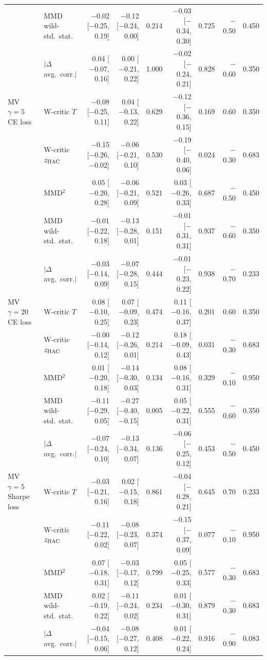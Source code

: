 \begin{tabular}{llrrrrrrr}
 & MMD wild-std.\ stat. & $-$0.02 [$-$0.25, 0.19] & $-$0.12 [$-$0.24, 0.00] & 0.214 & $-$0.03 [$-$0.34, 0.30] & 0.725 & $-$0.50 & 0.450 \\
 & $|\Delta$ avg.\ corr.$|$ & 0.04 [$-$0.07, 0.16] & 0.00 [$-$0.21, 0.22] & 1.000 & $-$0.02 [$-$0.24, 0.21] & 0.828 & $-$0.60 & 0.350 \\
MV $\gamma=5$ CE loss & W-critic $T$ & $-$0.08 [$-$0.25, 0.11] & 0.04 [$-$0.13, 0.22] & 0.629 & $-$0.12 [$-$0.36, 0.15] & 0.169 & 0.60 & 0.350 \\
 & W-critic $z_{\rm HAC}$ & $-$0.15 [$-$0.26, $-$0.02] & $-$0.06 [$-$0.21, 0.10] & 0.530 & $-$0.19 [$-$0.40, 0.06] & 0.024 & $-$0.30 & 0.683 \\
 & MMD$^2$ & 0.05 [$-$0.20, 0.28] & $-$0.06 [$-$0.21, 0.09] & 0.521 & 0.03 [$-$0.26, 0.33] & 0.687 & $-$0.50 & 0.450 \\
 & MMD wild-std.\ stat. & $-$0.01 [$-$0.22, 0.18] & $-$0.13 [$-$0.28, 0.01] & 0.151 & $-$0.01 [$-$0.31, 0.31] & 0.937 & $-$0.60 & 0.350 \\
 & $|\Delta$ avg.\ corr.$|$ & $-$0.03 [$-$0.14, 0.09] & $-$0.07 [$-$0.28, 0.15] & 0.444 & $-$0.01 [$-$0.23, 0.22] & 0.938 & $-$0.70 & 0.233 \\
MV $\gamma=20$ CE loss & W-critic $T$ & 0.08 [$-$0.10, 0.25] & 0.07 [$-$0.09, 0.23] & 0.474 & 0.11 [$-$0.16, 0.37] & 0.201 & 0.60 & 0.350 \\
 & W-critic $z_{\rm HAC}$ & $-$0.00 [$-$0.14, 0.12] & $-$0.12 [$-$0.26, 0.01] & 0.214 & 0.18 [$-$0.09, 0.43] & 0.031 & $-$0.30 & 0.683 \\
 & MMD$^2$ & 0.01 [$-$0.20, 0.18] & $-$0.14 [$-$0.30, 0.03] & 0.134 & 0.08 [$-$0.16, 0.31] & 0.329 & $-$0.10 & 0.950 \\
 & MMD wild-std.\ stat. & $-$0.11 [$-$0.29, 0.05] & $-$0.27 [$-$0.40, $-$0.15] & 0.005 & 0.05 [$-$0.22, 0.31] & 0.555 & $-$0.60 & 0.350 \\
 & $|\Delta$ avg.\ corr.$|$ & $-$0.07 [$-$0.24, 0.10] & $-$0.13 [$-$0.34, 0.07] & 0.136 & $-$0.06 [$-$0.25, 0.12] & 0.453 & $-$0.50 & 0.450 \\
MV $\gamma=5$ Sharpe loss & W-critic $T$ & $-$0.03 [$-$0.21, 0.16] & 0.02 [$-$0.15, 0.18] & 0.861 & $-$0.04 [$-$0.28, 0.21] & 0.645 & 0.70 & 0.233 \\
 & W-critic $z_{\rm HAC}$ & $-$0.11 [$-$0.22, 0.02] & $-$0.08 [$-$0.23, 0.07] & 0.374 & $-$0.15 [$-$0.37, 0.09] & 0.077 & $-$0.10 & 0.950 \\
 & MMD$^2$ & 0.07 [$-$0.18, 0.31] & $-$0.03 [$-$0.17, 0.12] & 0.799 & 0.05 [$-$0.25, 0.33] & 0.577 & $-$0.30 & 0.683 \\
 & MMD wild-std.\ stat. & 0.02 [$-$0.19, 0.22] & $-$0.11 [$-$0.24, 0.02] & 0.234 & 0.01 [$-$0.30, 0.31] & 0.879 & $-$0.30 & 0.683 \\
 & $|\Delta$ avg.\ corr.$|$ & $-$0.04 [$-$0.15, 0.06] & $-$0.08 [$-$0.27, 0.12] & 0.408 & 0.01 [$-$0.22, 0.24] & 0.916 & $-$0.90 & 0.083 \\
\bottomrule
\end{tabular}
